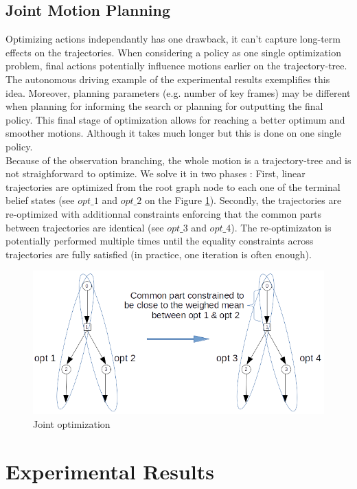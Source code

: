 \documentclass[conference]{IEEEtran}
\begin{document}
\subsection{Joint Motion Planning}
Optimizing actions independantly has one drawback, it can't capture long-term effects on the trajectories. When considering a policy as one single optimization problem, final actions potentially influence motions earlier on the trajectory-tree. The autonomous driving example of the experimental results exemplifies this idea. Moreover, planning parameters (e.g. number of key frames) may be different when planning for informing the search or planning for outputting the final policy. This final stage of optimization allows for reaching a better optimum and smoother motions. Although it takes much longer but this is done on one single policy. \\
Because of the observation branching, the whole motion is a trajectory-tree and is not straighforward to optimize. We solve it in two phases : First, linear trajectories are optimized from the root graph node to each one of the terminal belief states (see $opt\_1$ and $opt\_2$ on the Figure \ref{fig:joint}). Secondly, the trajectories are re-optimized with additionnal constraints enforcing that the common parts between trajectories are identical (see $opt\_3$ and $opt\_4$). The re-optimizaton is potentially performed multiple times until the equality constraints across trajectories are fully satisfied (in practice, one iteration is often enough).

\begin{figure}[h!]
  \centering
      \includegraphics[height=0.2\textwidth]{images/tree-joint_2.png}
  \caption{Joint optimization}
  \label{fig:joint}
\end{figure}

\section{Experimental Results}
\end{document}
